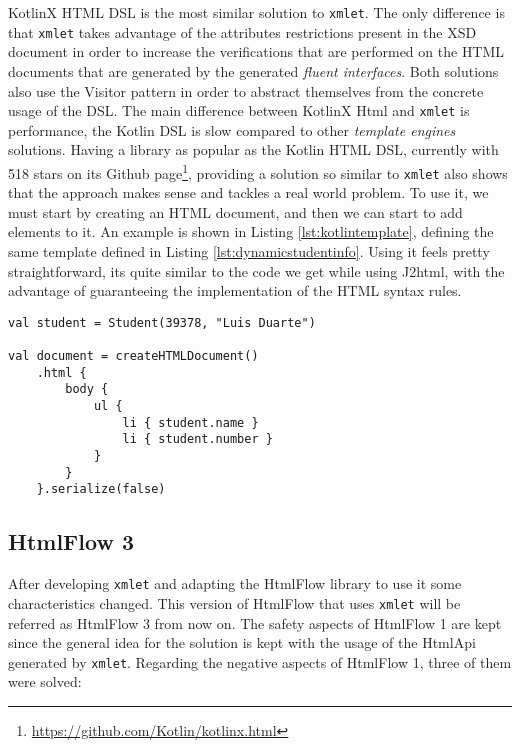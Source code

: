 \noindent
KotlinX\cite{kotlinx} \ac{HTML} \ac{DSL} is the most similar solution to \texttt{xmlet}. The only difference is that \texttt{xmlet} takes advantage of the attributes restrictions present in the \ac{XSD} document in order to increase the verifications that are performed on the \ac{HTML} documents that are generated by the generated \textit{fluent interfaces}. Both solutions also use the Visitor pattern in order to abstract themselves from the concrete usage of the \ac{DSL}. The main difference between KotlinX Html and \texttt{xmlet} is performance, the Kotlin \ac{DSL} is slow compared to other \textit{template engines} solutions. Having a library as popular as the Kotlin \ac{HTML} \ac{DSL}, currently with 518 stars on its Github page\footnote{\url{https://github.com/Kotlin/kotlinx.html}}, providing a solution so similar to \texttt{xmlet} also shows that the approach makes sense and tackles a real world problem. To use it, we must start by creating an \ac{HTML} document, and then we can start to add elements to it. An example is shown in Listing \ref{lst:kotlintemplate}, defining the same template defined in Listing \ref{lst:dynamicstudentinfo}. Using it feels pretty straightforward, its quite similar to the code we get while using J2html, with the advantage of guaranteeing the implementation of the \ac{HTML} syntax rules. 

\bigskip


\begin{minipage}{\linewidth}
\begin{lstlisting}[caption={Kotlin Template Example}, label={lst:kotlintemplate}]
val student = Student(39378, "Luis Duarte")

val document = createHTMLDocument()
    .html {
        body {
            ul {
                li { student.name }
                li { student.number }
            }
        }
    }.serialize(false)
\end{lstlisting}
\end{minipage}

\newpage

\subsection{HtmlFlow 3}
\label{sec:htmlflowwithxmlet}

After developing \texttt{xmlet} and adapting the HtmlFlow library to use it some characteristics changed. This version of HtmlFlow that uses \texttt{xmlet} will be referred as HtmlFlow 3 from now on. The safety aspects of HtmlFlow 1 are kept since the general idea for the solution is kept with the usage of the HtmlApi generated by \texttt{xmlet}. Regarding the negative aspects of HtmlFlow 1, three of them were solved:

